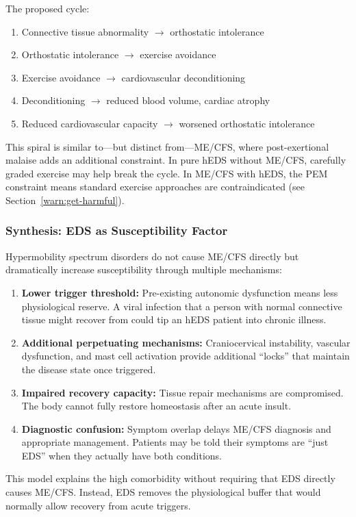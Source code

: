 The proposed cycle:
\begin{enumerate}
    \item Connective tissue abnormality $\rightarrow$ orthostatic intolerance
    \item Orthostatic intolerance $\rightarrow$ exercise avoidance
    \item Exercise avoidance $\rightarrow$ cardiovascular deconditioning
    \item Deconditioning $\rightarrow$ reduced blood volume, cardiac atrophy
    \item Reduced cardiovascular capacity $\rightarrow$ worsened orthostatic intolerance
\end{enumerate}

This spiral is similar to---but distinct from---ME/CFS, where post-exertional malaise adds an additional constraint. In pure hEDS without ME/CFS, carefully graded exercise may help break the cycle. In ME/CFS with hEDS, the PEM constraint means standard exercise approaches are contraindicated (see Section~\ref{warn:get-harmful}).

\subsubsection{Synthesis: EDS as Susceptibility Factor}

\begin{hypothesis}
\label{hyp:eds-susceptibility}
Hypermobility spectrum disorders do not cause ME/CFS directly but dramatically increase susceptibility through multiple mechanisms:

\begin{enumerate}
    \item \textbf{Lower trigger threshold:} Pre-existing autonomic dysfunction means less physiological reserve. A viral infection that a person with normal connective tissue might recover from could tip an hEDS patient into chronic illness.

    \item \textbf{Additional perpetuating mechanisms:} Craniocervical instability, vascular dysfunction, and mast cell activation provide additional ``locks'' that maintain the disease state once triggered.

    \item \textbf{Impaired recovery capacity:} Tissue repair mechanisms are compromised. The body cannot fully restore homeostasis after an acute insult.

    \item \textbf{Diagnostic confusion:} Symptom overlap delays ME/CFS diagnosis and appropriate management. Patients may be told their symptoms are ``just EDS'' when they actually have both conditions.
\end{enumerate}

This model explains the high comorbidity without requiring that EDS directly causes ME/CFS. Instead, EDS removes the physiological buffer that would normally allow recovery from acute triggers.
\end{hypothesis}

